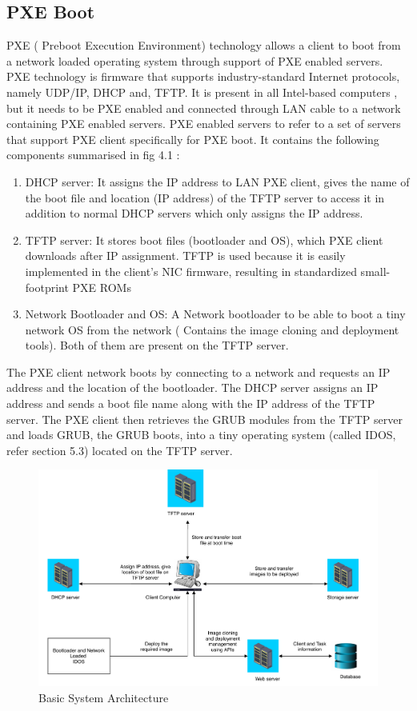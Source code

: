 \documentclass[a4paper,12pt]{article}
\begin{document}
\subsection{ PXE Boot}
PXE ( Preboot Execution Environment) technology allows a client to boot from a network loaded operating system through support of PXE enabled servers. PXE technology is firmware that supports industry-standard Internet protocols, namely UDP/IP, DHCP and, TFTP. It is present in all Intel-based computers \cite{pxe_intel}, but it needs to be PXE enabled and connected through LAN cable to a network containing PXE enabled servers. 
PXE enabled servers to refer to a set of servers that support PXE client specifically for PXE boot. It contains the following components summarised in fig 4.1 : 
\begin{enumerate}[label=\roman*.]
 \item DHCP server: It assigns the IP address to LAN PXE client, gives the name of the boot file and location (IP address) of the TFTP server to access it in addition to normal DHCP servers which only assigns the IP address.
 \item  TFTP server: It stores boot files (bootloader and OS), which  PXE client downloads after IP assignment. TFTP is used because it is easily implemented in the client's NIC firmware, resulting in standardized small-footprint PXE ROMs
 \item  Network Bootloader and OS: A Network bootloader to be able to boot a tiny network OS from the network ( Contains the image cloning and deployment tools). Both of them are present on the TFTP server.
 \end{enumerate}
 The PXE client network boots by connecting to a network and requests an IP address and the location of the bootloader. The DHCP server assigns an IP address and sends a boot file name along with the IP address of the TFTP server. The PXE client then retrieves the GRUB modules from the TFTP server and loads GRUB, the GRUB boots, into a tiny operating system (called IDOS, refer section 5.3) located on the TFTP server.
 \begin{figure}[h!]
    \centering
    \includegraphics[width=\linewidth]{basicsysarch.pdf}
    \caption{Basic System Architecture}
    \label{sys_arch}
\end{figure}
\end{document}
